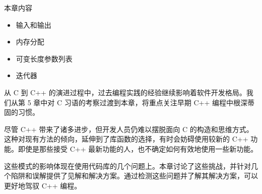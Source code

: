 本章内容

\begin{itemize}
\item
输入和输出

\item
内存分配

\item
可变长度参数列表

\item
迭代器
\end{itemize}

从 C 到 C++ 的演进过程中，过去编程实践的经验继续影响着软件开发格局。我们从第 5 章中对 C 习语的考察过渡到本章，将重点关注早期 C++ 编程中根深蒂固的习惯。

尽管 C++ 带来了诸多进步，但开发人员仍难以摆脱面向 C 的构造和思维方式。这种对现有方法的倾向，延伸到了库函数的选择，有时会妨碍使用较新的 C++ 功能。即使是那些接受 C++ 最新功能的人，也不确定如何有效地使用一些新功能。

这些模式的影响体现在使用代码库的几个问题上。本章讨论了这些挑战，并针对几个陷阱和误解提供了见解和解决方案。通过检测这些问题并了解其解决方案，可以更好地驾驭 C++ 编程。




